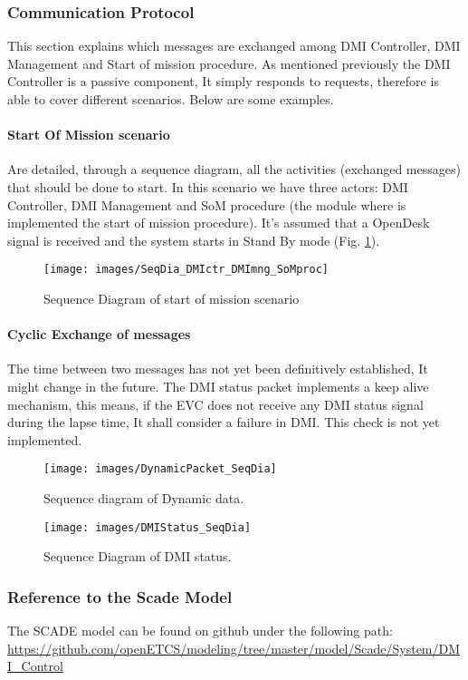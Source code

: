 \subsubsection{Communication Protocol}
This section explains which messages are exchanged among DMI Controller, DMI Management and Start of mission procedure. As mentioned previously the DMI Controller is a passive component, It simply responds to requests, therefore is able to cover different scenarios. Below are some examples.
  
  \paragraph{Start Of Mission scenario} Are detailed, through a sequence diagram, all the activities (exchanged messages) that should be done to start. In this scenario we have three actors: DMI Controller, DMI Management and SoM procedure (the module where is implemented the start of mission procedure). It's assumed that a OpenDesk signal is received and the system starts in Stand By mode (Fig. \ref{fig:SeqDiaSoM}).
 
  \begin{figure}
  \centering
  \texttt{[image: images/SeqDia\_DMIctr\_DMImng\_SoMproc]}
  \caption{Sequence Diagram of start of mission scenario}\label{fig:SeqDiaSoM}
  \end{figure}
  

\paragraph{Cyclic Exchange of messages}
The time between two messages has not yet been definitively established, It might change in the future. The DMI status packet implements a keep alive mechanism, this means, if the EVC does not receive any DMI status signal during the lapse time, It shall consider a failure in DMI. This check is not yet implemented.

    \begin{figure}
      \centering
      \texttt{[image: images/DynamicPacket\_SeqDia]}
      \caption{ Sequence diagram of Dynamic data.}\label{fig:SeqDiaDyn}
    \end{figure}
  
    \begin{figure}
      \centering
      \texttt{[image: images/DMIStatus\_SeqDia]}
      \caption{Sequence Diagram of DMI status.}\label{fig:SeqDiaStatus}
     \end{figure}
     

\subsubsection{Reference to the Scade Model}

The SCADE model can be found on github under the following path: \url{https://github.com/openETCS/modeling/tree/master/model/Scade/System/DMI_Control}